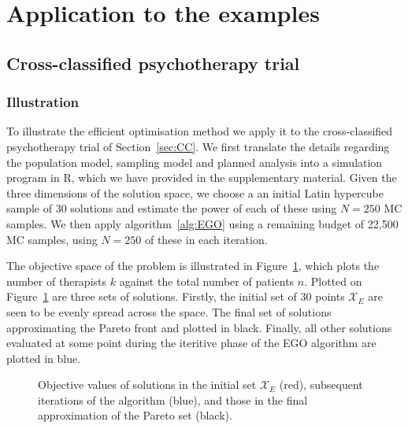 \documentclass{article} %
\begin{document}
\section{Application to the examples}\label{sec:illustrate}

\subsection{Cross-classified psychotherapy trial}

\subsubsection{Illustration}

To illustrate the efficient optimisation method we apply it to the cross-classified psychotherapy trial of Section~\ref{sec:CC}. We first translate the details regarding the population model, sampling model and planned analysis into a simulation program in R, which we have provided in the supplementary material. Given the three dimensions of the solution space, we choose a an initial Latin hypercube sample of 30 solutions and estimate the power of each of these using $N = 250$ MC samples. We then apply algorithm~\ref{alg:EGO} using a remaining budget of 22,500 MC samples, using $N = 250$ of these in each iteration. 

The objective space of the problem is illustrated in Figure~\ref{fig:single_run}, which plots the number of therapists $k$ against the total number of patients $n$. Plotted on Figure~\ref{fig:single_run} are three sets of solutions. Firstly, the initial set of 30 points $\mathcal{X}_{E}$ are seen to be evenly spread across the space. The final set of solutions approximating the Pareto front and plotted in black. Finally, all other solutions evaluated at some point during the iteritive phase of the EGO algorithm are plotted in blue.

\begin{figure}
\centering
\caption{Objective values of solutions in the initial set $\mathcal{X}_{E}$ (red), subsequent iterations of the algorithm (blue), and those in the final approximation of the Pareto set (black).}
\label{fig:single_run}
\end{figure}
\end{document}
